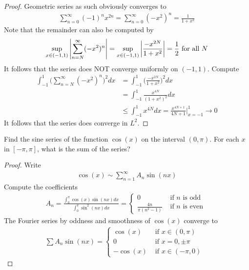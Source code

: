 \documentclass{report}
\begin{document}
\begin{proof}
Geometric series as such obviously  converges to 
\begin{align*}
\sum_{n=0}^{\infty} (-1)^n x^{2n}= \sum_{n=0}^{\infty}(-x^2)^n= \frac{1}{1+x^2}
\end{align*}
Note that the remainder can also be computed by 
\begin{align*}
  \sup_{x\in (-1,1)}\left|\sum_{n=N}^{\infty} (-x^2)^n\right|= \sup_{x \in (-1,1)}\left|\frac{-x^{2N}}{1+x^2}\right|= \frac{1}{2}\text{ for all }N
\end{align*}
It follows that the series does NOT converge uniformly on $(-1,1)$. Compute 
\begin{align*}
\int_{-1}^{1} \Big(\sum_{n=N}^{\infty} (-x^2)^n \Big)^2 dx&= \int_{-1}^1 \Big( \frac{-x^{2N}}{1+x^2} \Big)^2 dx  \\
&=\int_{-1}^1 \frac{x^{4N}}{(1+x^2)^2}dx \\
&\leq \int_{-1}^{1} x^{4N}dx= \frac{x^{4N+1}}{4N+1}\Big|_{x=-1}^{1}\to 0
\end{align*}
It follows that the series does converge in $L^2$. 
\end{proof}
\begin{question}{}{}
Find the sine series of the function $\cos (x)$ on the interval $(0,\pi )$. For each $x$ in $[-\pi ,\pi ]$, what is the sum of the series?  
\end{question}
\begin{proof}
Write 
\begin{align*}
\cos (x)\sim  \sum_{n=1}^{\infty} A_n \sin (n  x)
\end{align*}
Compute the coefficients   
\begin{align*}
 A_n = \frac{\int_0^{\pi } \cos (x)\sin (n  x)dx}{\int_0^{\pi }\sin^2 (nx)dx}=\begin{cases}
  0& \text{ if $n$ is odd } \\
  \frac{4n}{\pi  (n^2-1)}& \text{ if $n$ is even }
 \end{cases} 
\end{align*}
The Fourier series by oddness and smoothness of $\cos (x)$ converge to 
\begin{align*}
\sum A_n \sin (nx)= \begin{cases}
  \cos (x)& \text{ if $x\in (0,\pi )$ }\\
  0& \text{ if $x=0,\pm \pi $ } \\
  -\cos (x)& \text{ if $x\in (-\pi ,0)$ }
\end{cases}
\end{align*}
\end{proof}
\end{document}
